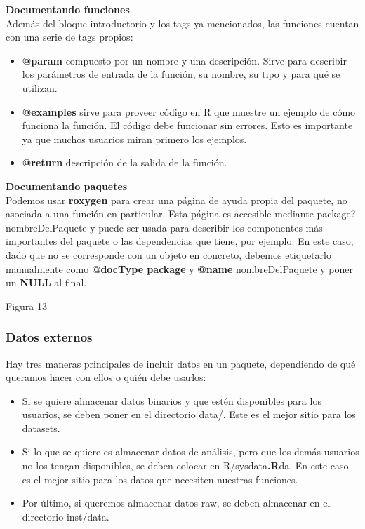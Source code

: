 \textbf{Documentando funciones} \\
Adem\'as del bloque introductorio y los tags ya mencionados, las funciones cuentan con una
serie de tags propios:
\begin{itemize}
    \item \textbf{@param} compuesto por un nombre y una descripci\'on. Sirve para describir los
par\'ametros de entrada de la funci\'on, su nombre, su tipo y para qu\'e se utilizan.
    \item \textbf{@examples} sirve para proveer c\'odigo en R que muestre un ejemplo de c\'omo funciona
la funci\'on. El c\'odigo debe funcionar sin errores. Esto es importante ya que muchos
usuarios miran primero los ejemplos.
    \item \textbf{@return} descripci\'on de la salida de la funci\'on.
\end{itemize}

\textbf{Documentando paquetes}\\

Podemos usar \textbf{roxygen} para crear una p\'agina de ayuda propia del paquete, no asociada a
una funci\'on en particular. Esta p\'agina es accesible mediante package?nombreDelPaquete y
puede ser usada para describir los componentes m\'as importantes del paquete o las
dependencias que tiene, por ejemplo.
En este caso, dado que no se corresponde con un objeto en concreto, debemos etiquetarlo
manualmente como \textbf{@docType package} y \textbf{@name} nombreDelPaquete y poner un \textbf{NULL} al
final.

Figura 13\\

\subsubsection{Datos externos}

Hay tres maneras principales de incluir datos en un paquete, dependiendo de qu\'e queramos
hacer con ellos o qui\'en debe usarlos:

\begin{itemize}
    \item Si se quiere almacenar datos binarios y que est\'en disponibles para los usuarios, se
deben poner en el directorio data/. Este es el mejor sitio para los datasets.
    \item Si lo que se quiere es almacenar datos de an\'alisis, pero que los dem\'as usuarios no
los tengan disponibles, se deben colocar en R/sysdata\textbf{.R}da. En este caso es el mejor
sitio para los datos que necesiten nuestras funciones.
    \item Por \'ultimo, si queremos almacenar datos raw, se deben almacenar en el directorio
inst/data.
\end{itemize}

